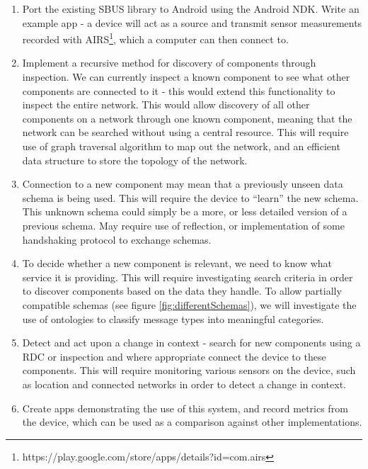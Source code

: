 \begin{enumerate}

\item Port the existing SBUS library to Android using the Android NDK. Write an example app - a device will act as a source and transmit sensor measurements recorded with AIRS\footnote{https://play.google.com/store/apps/details?id=com.airs}, which a computer can then connect to.

\item Implement a recursive method for discovery of components through inspection. We can currently inspect a known component to see what other components are connected to it - this would extend this functionality to inspect the entire network. This would allow discovery of all other components on a network through one known component, meaning that the network can be searched without using a central resource. This will require use of graph traversal algorithm to map out the network, and an efficient data structure to store the topology of the network.

\item Connection to a new component may mean that a previously unseen data schema is being used. This will require the device to ``learn'' the new schema. This unknown schema could simply be a more, or less detailed version of a previous schema. May require use of reflection, or implementation of some handshaking protocol to exchange schemas.

\item To decide whether a new component is relevant, we need to know what service it is providing. This will require investigating search criteria in order to discover components based on the data they handle. To allow partially compatible schemas (see figure \ref{fig:differentSchemas}), we will investigate the use of ontologies to classify message types into meaningful categories.

\item Detect and act upon a change in context - search for new components using a RDC or inspection and where appropriate connect the device to these components. This will require monitoring various sensors on the device, such as location and connected networks in order to detect a change in context.

\item Create apps demonstrating the use of this system, and record metrics from the device, which can be used as a comparison against other implementations.


\end{enumerate}

